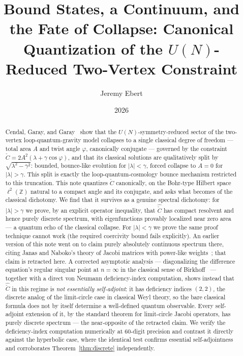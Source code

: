 \documentclass[11pt]{amsart}
\title{Bound States, a Continuum, and the Fate of Collapse: Canonical Quantization of the $U(N)$-Reduced Two-Vertex Constraint}
\author{Jeremy Ebert}
\date{2026}
\theoremstyle{remark}
\begin{document}
\maketitle

\begin{abstract}
Cendal, Garay, and Garay~\cite{CendalGarayGaray} show that the $U(N)$-symmetry-reduced sector of the two-vertex loop-quantum-gravity model \cite{BorjaFreidelGarayLivine,BorjaDiazPoloGarayLivine} collapses to a single classical degree of freedom --- total area $A$ and twist angle $\varphi$, canonically conjugate --- governed by the constraint $\check C=2A^2(\lambda+\gamma\cos\varphi)$, and that its classical solutions are qualitatively split by $\sqrt{\lambda^2-\gamma^2}$: bounded, bounce-like evolution for $|\lambda|<\gamma$, forced collapse to $A=0$ for $|\lambda|>\gamma$. This split is exactly the loop-quantum-cosmology bounce mechanism restricted to this truncation. This note quantizes $\check C$ canonically, on the Bohr-type Hilbert space $\ell^2(\mathbb Z)$ natural to a compact angle and its conjugate, and asks what becomes of the classical dichotomy. We find that it survives as a genuine spectral dichotomy: for $|\lambda|>\gamma$ we prove, by an explicit operator inequality, that $\hat{\check C}$ has compact resolvent and hence purely discrete spectrum, with eigenfunctions provably localized near zero area --- a quantum echo of the classical collapse. For $|\lambda|<\gamma$ we prove the same proof technique cannot work (the required coercivity bound fails explicitly). An earlier version of this note went on to claim purely absolutely continuous spectrum there, citing Janas and Naboko's theory of Jacobi matrices with power-like weights~\cite{JanasNabokoMultithreshold,JanasNabokoPowerLike}; that claim is retracted here. A corrected asymptotic analysis --- diagonalizing the difference equation's regular singular point at $n=\infty$ in the classical sense of Birkhoff~\cite{Birkhoff,BirkhoffTrjitzinsky} --- together with a direct von Neumann deficiency-index computation, shows instead that $\hat{\check C}$ in this regime is \emph{not essentially self-adjoint}: it has deficiency indices $(2,2)$, the discrete analog of the limit-circle case in classical Weyl theory, so the bare classical formula does not by itself determine a well-defined quantum observable. Every self-adjoint extension of it, by the standard theorem for limit-circle Jacobi operators, has purely discrete spectrum --- the near-opposite of the retracted claim. We verify the deficiency-index computation numerically at $60$-digit precision and contrast it directly against the hyperbolic case, where the identical test confirms essential self-adjointness and corroborates Theorem~\ref{thm:discrete} independently.
\end{abstract}
\end{document}
